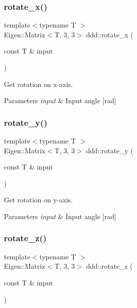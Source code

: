 \subsubsection{\texorpdfstring{rotate\+\_\+x()}{rotate\_x()}}
{\footnotesize\ttfamily template$<$typename T $>$ \\
Eigen\+::\+Matrix$<$T, 3, 3$>$ ddd\+::rotate\+\_\+x (\begin{DoxyParamCaption}\item[{const T \&}]{input }\end{DoxyParamCaption})\hspace{0.3cm}{\ttfamily [inline]}}



Get rotation on x-\/axis. 


\begin{DoxyParams}{Parameters}
{\em input} & Input angle \mbox{[}rad\mbox{]} \\
\hline
\end{DoxyParams}
\mbox{\label{namespaceddd_a91c74ff16a602f1f611759e2e9f594f3}} 
\subsubsection{\texorpdfstring{rotate\+\_\+y()}{rotate\_y()}}
{\footnotesize\ttfamily template$<$typename T $>$ \\
Eigen\+::\+Matrix$<$T, 3, 3$>$ ddd\+::rotate\+\_\+y (\begin{DoxyParamCaption}\item[{const T \&}]{input }\end{DoxyParamCaption})\hspace{0.3cm}{\ttfamily [inline]}}



Get rotation on y-\/axis. 


\begin{DoxyParams}{Parameters}
{\em input} & Input angle \mbox{[}rad\mbox{]} \\
\hline
\end{DoxyParams}
\mbox{\label{namespaceddd_a8b9d6f84cbf4f443881fd3b3abad07e4}} 
\subsubsection{\texorpdfstring{rotate\+\_\+z()}{rotate\_z()}}
{\footnotesize\ttfamily template$<$typename T $>$ \\
Eigen\+::\+Matrix$<$T, 3, 3$>$ ddd\+::rotate\+\_\+z (\begin{DoxyParamCaption}\item[{const T \&}]{input }\end{DoxyParamCaption})\hspace{0.3cm}{\ttfamily [inline]}}



